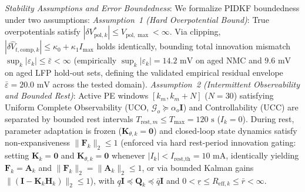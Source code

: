 \documentclass[balance,nocopyright,upint,varvw,hyphenate,barcolor=NavyBlue,nolists]{asmejour}
\begin{document}
\emph{Stability Assumptions and Error Boundedness}: We formalize PIDKF boundedness under two assumptions:
\emph{Assumption~1 (Hard Overpotential Bound)}: True overpotentials satisfy $|\delta V_{\text{pol},k}^*| \le V_{\text{pol},\max} < \infty$. Via clipping, $|\delta \hat{V}_{t,\text{comp},k}| \le \kappa_0 + \kappa_1 I_{\max}$ holds identically, bounding total innovation mismatch $\sup_k |\varepsilon_k| \le \bar{\varepsilon} < \infty$ (empirically $\sup_k |\varepsilon_k| = 14.2\text{ mV}$ on aged NMC and $9.6\text{ mV}$ on aged LFP hold-out sets, defining the validated empirical residual envelope $\bar{\varepsilon} = 20.0\text{ mV}$ across the tested domain).
\emph{Assumption~2 (Intermittent Observability and Bounded Rest)}: Active PE windows $[k_m, k_m+N]$ ($N=30$) satisfying Uniform Complete Observability (UCO, $\mathcal{G}_o \succeq \alpha_o \mathbf{I}$) and Controllability (UCC) are separated by bounded rest intervals $T_{\text{rest},m} \le T_{\max} = 120\text{ s}$ ($I_k = 0$). During rest, parameter adaptation is frozen ($\mathbf{K}_{\theta,k} = \mathbf{0}$) and closed-loop state dynamics satisfy non-expansiveness $\|\mathbf{F}_k\|_2 \le 1$ (enforced via hard rest-period innovation gating: setting $\mathbf{K}_k = \mathbf{0}$ and $\mathbf{K}_{\theta,k} = \mathbf{0}$ whenever $|I_k| < I_{\text{rest,th}} = 10\text{ mA}$, identically yielding $\mathbf{F}_k = \mathbf{A}_k$ and $\|\mathbf{F}_k\|_2 = \|\mathbf{A}_k\|_2 \le 1$, or via bounded Kalman gains $\|(\mathbf{I} - \mathbf{K}_k\mathbf{H}_k)\|_2 \le 1$), with $\underline{q}\mathbf{I} \preceq \mathbf{Q}_k \preceq \bar{q}\mathbf{I}$ and $0 < \underline{r} \le R_{\text{eff},k} \le \bar{r} < \infty$.
\end{document}
